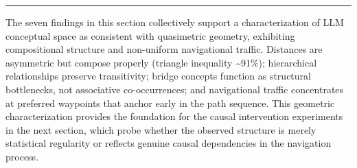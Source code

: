 \begin{center}\rule{0.5\linewidth}{0.5pt}\end{center}

The seven findings in this section collectively support a characterization of LLM conceptual space as consistent with quasimetric geometry, exhibiting compositional structure and non-uniform navigational traffic. Distances are asymmetric but compose properly (triangle inequality \textasciitilde91\%); hierarchical relationships preserve transitivity; bridge concepts function as structural bottlenecks, not associative co-occurrences; and navigational traffic concentrates at preferred waypoints that anchor early in the path sequence. This geometric characterization provides the foundation for the causal intervention experiments in the next section, which probe whether the observed structure is merely statistical regularity or reflects genuine causal dependencies in the navigation process.
